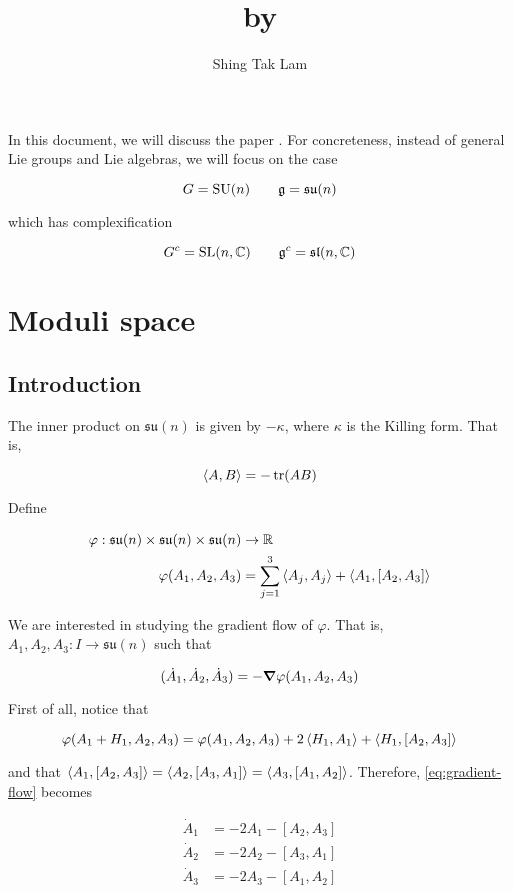 \documentclass{report}
\title{\citetitle{kronheimer_instantons_1990} by \Citeauthor{kronheimer_instantons_1990}}
\author{Shing Tak Lam}
\DeclareMathOperator{\SU}{SU}
\newcommand{\su}{\mathfrak{su}}
\renewcommand{\sl}{\mathfrak{sl}}
\begin{document}
\maketitle

In this document, we will discuss the paper \cite{kronheimer_instantons_1990}. For concreteness, instead of general Lie groups and Lie algebras, we will focus on the case

\[G = \SU(n) \qquad \mfg = \su(n)\]

which has complexification

\[G^c = \SL(n, \C) \qquad \mfg^c = \sl(n, \C)\]

\tableofcontents

\chapter{Moduli space}

\section{Introduction}

The inner product on \(\su(n)\) is given by \(-\kappa\), where \(\kappa\) is the Killing form. That is,

\[\left\langle A, B \right\rangle = -\tr(AB)\]

Define

\begin{align*}
    \varphi : \su(n) \times \su(n) \times \su(n) &\to \R \\
    \varphi(A_1, A_2, A_3) &= \sum_{j=1}^3 \inner{A_j, A_j} + \inner{A_1, [A_2, A_3]}
\end{align*}

We are interested in studying the gradient flow of \(\varphi\). That is, \(A_1, A_2, A_3 : I \to \su(n)\) such that

\begin{equation}
    \label{eq:gradient-flow}
    (\dot A_1, \dot A_2, \dot A_3) = -\grad \varphi(A_1, A_2, A_3)
\end{equation}

First of all, notice that

\[\varphi(A_1 + H_1, A_2, A_3) = \varphi(A_1, A_2, A_3) + 2\left\langle H_1, A_1 \right\rangle + \left\langle H_1, [A_2, A_3] \right\rangle\]

and that \(\left\langle A_1, [A_2, A_3] \right\rangle = \left\langle A_2, [A_3, A_1] \right\rangle = \left\langle A_3, [A_1, A_2] \right\rangle\). Therefore, \cref{eq:gradient-flow} becomes

\begin{equation}
    \label{eq:gradient-flow-system}
    \begin{split}
        \dot A_1 &= -2A_1 - [A_2, A_3] \\
        \dot A_2 &= -2A_2 - [A_3, A_1] \\
        \dot A_3 &= -2A_3 - [A_1, A_2]
    \end{split}
\end{equation}
\end{document}
